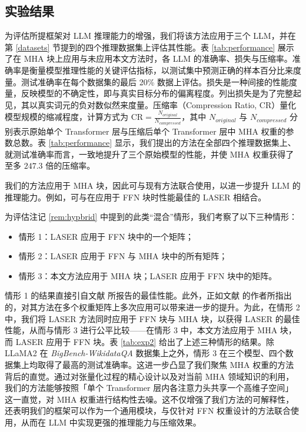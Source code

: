 \subsection{实验结果}
为评估所提框架对 LLM 推理能力的增强，我们将该方法应用于三个 LLM，并在第 \ref{datasets} 节提到的四个推理数据集上评估其性能。表 \ref{tab:performance} 展示了在 MHA 块上应用与未应用本文方法时，各 LLM 的准确率、损失与压缩率。准确率是衡量模型推理性能的关键评估指标，以测试集中预测正确的样本百分比来度量。测试准确率在每个数据集的最后 20\% 数据上评估。损失是一种间接的性能度量，反映模型的不确定性，即与真实目标分布的偏离程度。列出损失是为了完整起见，其以真实词元的负对数似然来度量。压缩率（Compression Ratio, CR）量化模型规模的缩减程度，计算方式为 $\text{CR}= \frac{N_{original}}{N_{compressed}}$，其中 $N_{original}$ 与 $N_{compressed}$ 分别表示原始单个 Transformer 层与压缩后单个 Transformer 层中 MHA 权重的参数总数。表 \ref{tab:performance} 显示，我们提出的方法在全部四个推理数据集上、就测试准确率而言，一致地提升了三个原始模型的性能，并使 MHA 权重获得了至多 $247.3$ 倍的压缩率。\par 

\begin{rem}
我们的方法应用于 MHA 块，因此可与现有方法联合使用，以进一步提升 LLM 的推理能力。例如，可与在应用于 FFN 块时性能最佳的 LASER \cite{sharma2023truth} 相结合。
\label{rem:hypbrid}
\end{rem}

为评估注记 \ref{rem:hypbrid} 中提到的此类``混合''情形，我们考察了以下三种情形：
\begin{itemize}
    \item 情形 1：LASER \cite{sharma2023truth} 应用于 FFN 块中的一个矩阵；
    \item 情形 2：LASER \cite{sharma2023truth} 应用于 FFN 与 MHA 块中的所有矩阵；
    \item 情形 3：本文方法应用于 MHA 块；LASER \cite{sharma2023truth} 应用于 FFN 块中的矩阵。
\end{itemize}
情形 1 的结果直接引自文献 \cite{sharma2023truth} 所报告的最佳性能。此外，正如文献 \cite{sharma2023truth} 的作者所指出的，对其方法在多个权重矩阵上多次应用可以带来进一步的提升。为此，在情形 2 中，我们将 LASER 方法同时应用于 FFN 块与 MHA 块，以获得 LASER 的最佳性能，从而与情形 3 进行公平比较——在情形 3 中，本文方法应用于 MHA 块，而 LASER 应用于 FFN 块。表 \ref{tab:exp2} 给出了上述三种情形的结果。除 LLaMA2 在 \textit{BigBench-WikidataQA} 数据集上之外，情形 3 在三个模型、四个数据集上均取得了最高的测试准确率。这进一步凸显了我们聚焦 MHA 权重的方法背后的直觉。通过对张量化过程的精心设计以及对当前 MHA 领域知识的利用，我们的方法能够按照「单个 Transformer 层内各注意力头共享一个高维子空间」这一直觉，对 MHA 权重进行结构性去噪。这不仅增强了我们方法的可解释性，还表明我们的框架可以作为一个通用模块，与仅针对 FFN 权重设计的方法联合使用，从而在 LLM 中实现更强的推理能力与压缩效果。

